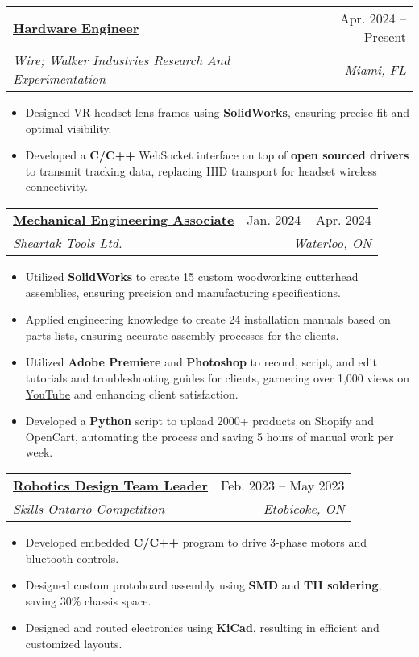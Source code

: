 \documentclass[letterpaper]{article}
\makeatletter
\newcommand{\resumeItem}[1]{
  \item\small{
    {#1 \vspace{-2pt}}
  }
}
\newcommand{\resumeSubheading}[4]{
  \vspace{-2pt}\item
    \begin{tabular*}{0.97\textwidth}[t]{l@{\extracolsep{\fill}}r}
      \textbf{#1} & #2 \\
      \textit{\small#3} & \textit{\small #4} \\
    \end{tabular*}\vspace{-7pt}
}
\newcommand{\resumeItemListStart}{\begin{itemize}}
\newcommand{\resumeItemListEnd}{\end{itemize}\vspace{-5pt}}
\makeatother
\begin{document}
    \resumeSubheading
      {\underline{\href{https://www.walkerindustries.xyz/}{Hardware Engineer}}}{Apr. 2024 -- Present}
      {Wire; Walker Industries Research And Experimentation}{Miami, FL}
      \resumeItemListStart
        \resumeItem{Designed VR headset lens frames using \textbf{SolidWorks}, ensuring precise fit and optimal visibility.}
        \resumeItem{Developed a \textbf{C/C++} WebSocket interface on top of \textbf{open sourced drivers} to transmit tracking data, replacing HID transport for headset wireless connectivity.}
      \resumeItemListEnd

    \resumeSubheading
      {\underline{\href{https://www.gavintranquilino.com/sheartak.html}{Mechanical Engineering Associate}}}{Jan. 2024 -- Apr. 2024}
      {Sheartak Tools Ltd.}{Waterloo, ON}
      \resumeItemListStart
        \resumeItem{Utilized \textbf{SolidWorks} to create 15 custom woodworking cutterhead assemblies, ensuring precision and manufacturing specifications.}
        \resumeItem{Applied engineering knowledge to create 24 installation manuals based on parts lists, ensuring accurate assembly processes for the clients.}
        \resumeItem{Utilized \textbf{Adobe Premiere} and \textbf{Photoshop} to record, script, and edit tutorials and troubleshooting guides for clients, garnering over 1,000 views on \underline{\href{https://www.youtube.com/playlist?list=PL2zKq55_kXLeLsMzZH8ny8A34vHwAoc7n}{YouTube}} and enhancing client satisfaction.}
        \resumeItem{Developed a \textbf{Python} script to upload 2000+ products on Shopify and OpenCart, automating the process and saving 5 hours of manual work per week.}
      \resumeItemListEnd

    \resumeSubheading
      {\underline{\href{https://www.gavintranquilino.com/hockey-robot.html}{Robotics Design Team Leader}}}{Feb. 2023 -- May 2023}
      {Skills Ontario Competition}{Etobicoke, ON}
      \resumeItemListStart
        \resumeItem{Developed embedded \textbf{C/C++} program to drive 3-phase motors and bluetooth controls.}
        \resumeItem{Designed custom protoboard assembly using \textbf{SMD} and \textbf{TH soldering}, saving 30\% chassis space.}
        \resumeItem{Designed and routed electronics using \textbf{KiCad}, resulting in efficient and customized layouts.}
    \resumeItemListEnd
    
\end{document}
